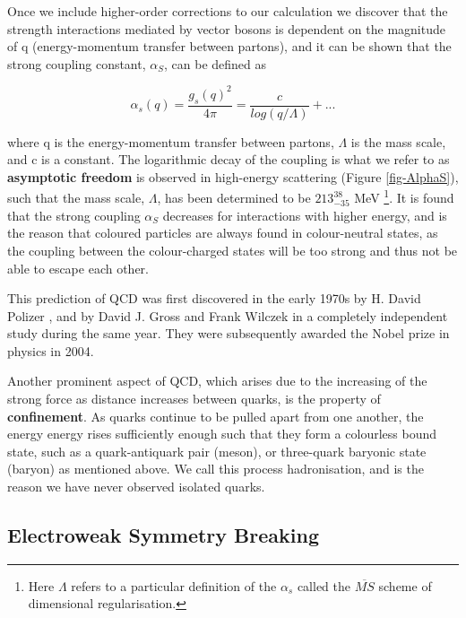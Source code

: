 Once we include higher-order corrections to our calculation we discover that the strength interactions mediated by vector bosons is dependent on the magnitude of q (energy-momentum transfer between partons), and it can be shown that the strong coupling constant, $\alpha_S$, can be defined as

\begin{equation} \label{eqn-AlphaS}
\alpha_s(q) = \frac{g_s(q)^2}{4\pi} = \frac{c}{log(q/\Lambda)} + ...
\end{equation}

where q is the energy-momentum transfer between partons, $\Lambda$ is the mass scale, and c is a constant. The logarithmic decay of the coupling is what we refer to as \textbf{asymptotic freedom} is observed in high-energy scattering (Figure \ref{fig-AlphaS}), such that the mass scale, $\Lambda$, has been determined to be $213^{38}_{-35}$ MeV \cite{Bethke:2000ai}\footnote{Here $\Lambda$ refers to a particular definition of the $\alpha_s$ called the $\overline{MS}$ scheme of dimensional regularisation.}. It is found that the strong coupling $\alpha_S$ decreases for interactions with higher energy, and is the reason that coloured particles are always found in colour-neutral states, as the coupling between the colour-charged states will be too strong and thus not be able to escape each other.

This prediction of QCD was first discovered in the early 1970s by H. David Polizer \cite{PhysRevLett.30.1346}, and by David J. Gross and Frank Wilczek \cite{PhysRevD.8.3633} in a completely independent study during the same year. They were subsequently awarded the Nobel prize in physics in 2004.

Another prominent aspect of QCD, which arises due to the increasing of the strong force as distance increases between quarks, is the property of \textbf{confinement}. As quarks continue to be pulled apart from one another, the energy energy rises sufficiently enough such that they form a colourless bound state, such as a quark-antiquark pair (meson), or three-quark baryonic state (baryon) as mentioned above. We call this process hadronisation, and is the reason we have never observed isolated quarks.  


\subsection{Electroweak Symmetry Breaking} \label{subsec-ElectroweakSymmetryBreaking}

